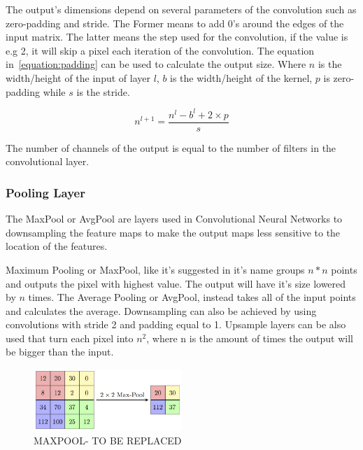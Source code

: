 The output's dimensions depend on several parameters of the convolution such as zero-padding and stride. The Former means to add 0's around the edges
of the input matrix. The latter means the step used for the convolution, if the value is e.g 2, it will skip a pixel each iteration of the convolution.
The equation in~\ref{equation:padding} can be used to calculate the output size. Where $n$ is the width/height of the input of layer $l$,
$ b$ is the width/height of the kernel, $p$ is  zero-padding while $s$ is the stride.

\begin{equation} \label{equation:padding}
     n^{l+1} = \frac{n^{l}- b^{l}+2 \times p}{s}
\end{equation}

The number of channels of the output is equal to the number of filters
in the convolutional layer.




\subsubsection{Pooling Layer}

\quad The MaxPool or AvgPool are layers used in Convolutional Neural Networks to downsampling the feature maps to make 
the output maps less sensitive to the location of the features.

Maximum Pooling or MaxPool, like it's suggested in it's name groups $ n * n $ points and outputs the pixel with highest value.
 The output will have it's size lowered by $ n $ times.
The Average Pooling or AvgPool, instead takes all of the input points and calculates the average. Downsampling can also be achieved by using convolutions with stride 2 and padding equal to 1.
Upsample layers can be also used that turn each pixel into $ n^{2} $, where n is the amount of times the output will be bigger than the input.

\begin{figure}[!htbp]
    \centering
    \includegraphics[width=0.5\textwidth]{Figures/maxpool.png}
    \caption{MAXPOOL- TO BE REPLACED}
    \label{figure:maxpool}
\end{figure} 
 

